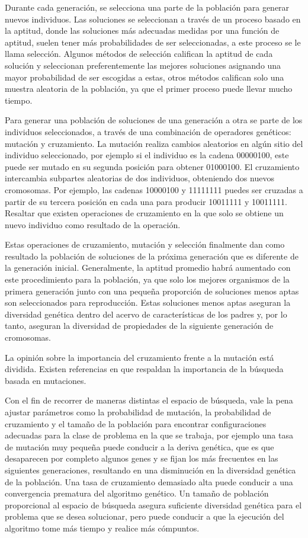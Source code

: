 Durante cada generación, se selecciona una parte de la población para generar nuevos individuos. Las soluciones se seleccionan a través de un proceso basado en la aptitud, donde las soluciones más adecuadas medidas por una función de aptitud, suelen tener más probabilidades de ser seleccionadas, a este proceso se le llama selección. Algunos métodos de selección califican la aptitud de cada solución y seleccionan preferentemente las mejores soluciones asignando una mayor probabilidad de ser escogidas a estas, otros métodos califican solo una muestra aleatoria de la población, ya que el primer proceso puede llevar mucho tiempo.

Para generar una población de soluciones de una generación a otra se parte de los individuos seleccionados, a través de una combinación de operadores genéticos: mutación y cruzamiento. La mutación realiza cambios aleatorios en algún sitio del individuo seleccionado, por ejemplo si el individuo es la cadena 00000100, este puede ser mutado en su segunda posición para obtener 01000100. El cruzamiento intercambia subpartes aleatorias de dos individuos, obteniendo dos nuevos cromosomas. Por ejemplo, las cadenas 10000100 y 11111111 puedes ser cruzadas a partir de su tercera posición en cada una para producir 10011111 y 10011111. Resaltar que existen operaciones de cruzamiento en la que solo se obtiene un nuevo individuo como resultado de la operación.

Estas operaciones de cruzamiento, mutación y selección finalmente dan como resultado la población de soluciones de la próxima generación que es diferente de la generación inicial. Generalmente, la aptitud promedio habrá aumentado con este procedimiento para la población, ya que solo los mejores organismos de la primera generación junto con una pequeña proporción de soluciones menos aptas son seleccionados para reproducción. Estas soluciones menos aptas aseguran la diversidad genética dentro del acervo de características de los padres y, por lo tanto, aseguran la diversidad de propiedades de la siguiente generación de cromosomas.

La opinión sobre la importancia del cruzamiento frente a la mutación está dividida. Existen referencias en \cite{fogel2006evolutionary} que respaldan la importancia de la búsqueda basada en mutaciones.

Con el fin de recorrer de maneras distintas el espacio de búsqueda, vale la pena ajustar parámetros como la probabilidad de mutación, la probabilidad de cruzamiento y el tamaño de la población para encontrar configuraciones adecuadas para la clase de problema en la que se trabaja, por ejemplo una tasa de mutación muy pequeña puede conducir a la deriva genética, que es que desaparecen por completo algunos genes y se fijan los más frecuentes en las siguientes generaciones, resultando en una disminución en la diversidad genética de la población. Una tasa de cruzamiento demasiado alta puede conducir a una convergencia prematura del algoritmo genético. Un tamaño de población proporcional al espacio de búsqueda asegura suficiente diversidad genética para el problema que se desea solucionar, pero puede conducir a que la ejecución del algoritmo tome más tiempo y realice más cómpuntos.

